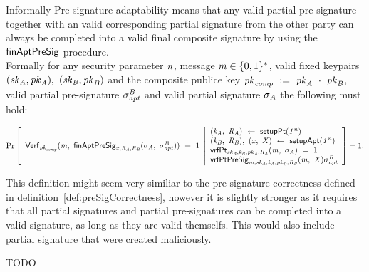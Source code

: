 \begin{definition}
    Informally Pre-signature adaptability means that any valid partial pre-signature together with an valid corresponding partial signature from the other party can
    always be completed into a valid final composite signature by using the $\mathsf{finAptPreSig}$ procedure.\\
    Formally for any security parameter $\mathit{n}$, message $\mathit{m} \in \{0,1\}^{*}$, valid fixed keypairs $(\mathit{sk}_{\mathit{A}}, \mathit{pk}_{\mathit{A}}) ,~ (\mathit{sk}_{\mathit{B}}, \mathit{pk}_{\mathit{B}})$ and the composite publice key $\mathit{pk}_{\mathit{comp}} ~:=~ \mathit{pk}_{\mathit{A}} ~\cdot~ \mathit{pk}_{\mathit{B}}$, valid partial pre-signature $\sigma^{\mathit{B}}_{\mathit{apt}}$ and valid partial signature $\sigma_{\mathit{A}}$ the following must hold:
    \begin{scriptsize}
        \[
            \Pr\left[
            \begin{array}{c}
                \mathsf{Verf}_{\mathit{pk}_{\mathit{comp}}}(\mathit{m} ,~ \mathsf{finAptPreSig}_{\mathit{x},\mathit{R}_{\mathit{A}},\mathit{R}_{\mathit{B}}}(\sigma_{\mathit{A}} ,~ \sigma^{\mathit{B}}_{\mathit{apt}})) ~=~ 1
            \end{array}
            \middle\vert
            \begin{array}{l}
                (\mathit{\mathit{k}_{\mathit{A}}} ,~ \mathit{R}_{\mathit{A}}) ~\leftarrow~ \mathsf{setupPt} (\mathit{1^n}) \\
                (\mathit{\mathit{k}_{\mathit{B}}} ,~ \mathit{R}_{\mathit{B}}) ,~ (\mathit{x} ,~ \mathit{X}) ~\leftarrow~ \mathsf{setupApt}(\mathit{1^n}) \\
                \mathsf{vrfPt}_{\mathit{sk}_{\mathit{B}},\mathit{\mathit{k}_{\mathit{B}}},\mathit{pk}_{\mathit{A}},\mathit{R}_{\mathit{A}}}(\mathit{m} ,~ \sigma_{\mathit{A}}) ~=~ 1 \\
                \mathsf{vrfPtPreSig}_{\mathit{m},\mathit{sk}_{\mathit{A}},\mathit{\mathit{k}_{\mathit{A}}},\mathit{pk}_{\mathit{B}},\mathit{R}_{\mathit{B}}}(\mathit{m} ,~ \mathit{X}){\sigma^{\mathit{B}}_{\mathit{apt}}}
            \end{array}
            \right]=1.
        \]
    \end{scriptsize}
    This definition might seem very similiar to the pre-signature correctness defined in definition~\ref{def:preSigCorrectness}, however it is slightly stronger as it requires that all partial signatures and partial pre-signatures can be completed into a valid signature, as long as they are valid themselfs. This would also include partial signature that were created maliciously.
\end{definition}

\begin{definition}
    TODO~\cite{aumayr2020bitcoinchannels}
\end{definition}

